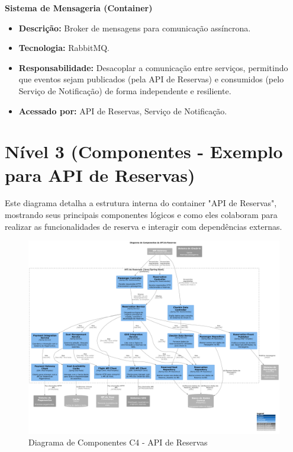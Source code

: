 \textbf{Sistema de Mensageria (Container)}
\begin{itemize}
    \item \textbf{Descrição:} Broker de mensagens para comunicação assíncrona.
    \item \textbf{Tecnologia:} RabbitMQ.
    \item \textbf{Responsabilidade:} Desacoplar a comunicação entre serviços, permitindo que eventos sejam publicados (pela API de Reservas) e consumidos (pelo Serviço de Notificação) de forma independente e resiliente.
    \item \textbf{Acessado por:} API de Reservas, Serviço de Notificação.
\end{itemize}

\section{Nível 3 (Componentes - Exemplo para API de Reservas)}
\label{sec:c4-componentes}

Este diagrama detalha a estrutura interna do container "API de Reservas", mostrando seus principais componentes lógicos e como eles colaboram para realizar as funcionalidades de reserva e interagir com dependências externas.

\begin{figure}[htbp]
    \centering
    \includegraphics[width=1.4\textwidth, angle=90]{assets/c4-n3-component-api-reservas.pdf}
    \caption{Diagrama de Componentes C4 - API de Reservas}
    \label{fig:c4-componentes-api-reservas}
\end{figure}

